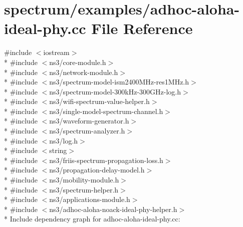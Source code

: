 \hypertarget{adhoc-aloha-ideal-phy_8cc}{}\section{spectrum/examples/adhoc-\/aloha-\/ideal-\/phy.cc File Reference}
\label{adhoc-aloha-ideal-phy_8cc}
{\ttfamily \#include $<$iostream$>$}\\*
{\ttfamily \#include $<$ns3/core-\/module.\+h$>$}\\*
{\ttfamily \#include $<$ns3/network-\/module.\+h$>$}\\*
{\ttfamily \#include $<$ns3/spectrum-\/model-\/ism2400\+M\+Hz-\/res1\+M\+Hz.\+h$>$}\\*
{\ttfamily \#include $<$ns3/spectrum-\/model-\/300k\+Hz-\/300\+G\+Hz-\/log.\+h$>$}\\*
{\ttfamily \#include $<$ns3/wifi-\/spectrum-\/value-\/helper.\+h$>$}\\*
{\ttfamily \#include $<$ns3/single-\/model-\/spectrum-\/channel.\+h$>$}\\*
{\ttfamily \#include $<$ns3/waveform-\/generator.\+h$>$}\\*
{\ttfamily \#include $<$ns3/spectrum-\/analyzer.\+h$>$}\\*
{\ttfamily \#include $<$ns3/log.\+h$>$}\\*
{\ttfamily \#include $<$string$>$}\\*
{\ttfamily \#include $<$ns3/friis-\/spectrum-\/propagation-\/loss.\+h$>$}\\*
{\ttfamily \#include $<$ns3/propagation-\/delay-\/model.\+h$>$}\\*
{\ttfamily \#include $<$ns3/mobility-\/module.\+h$>$}\\*
{\ttfamily \#include $<$ns3/spectrum-\/helper.\+h$>$}\\*
{\ttfamily \#include $<$ns3/applications-\/module.\+h$>$}\\*
{\ttfamily \#include $<$ns3/adhoc-\/aloha-\/noack-\/ideal-\/phy-\/helper.\+h$>$}\\*
Include dependency graph for adhoc-\/aloha-\/ideal-\/phy.cc\+:
